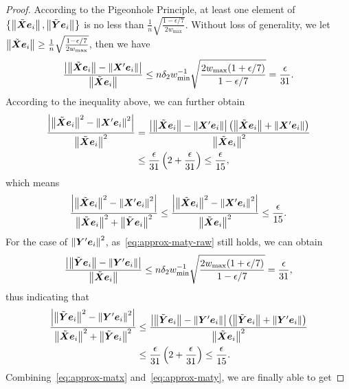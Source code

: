 \documentclass[sigconf]{acmart}
\begin{document}
\begin{proof}
    According to the Pigeonhole Principle, at least one element of \(\setof{\Abs{\tilde{\matx}\vece_i},\Abs{\tilde{\maty}\vece_i}}\) is no less than \(\frac{1}{n}\sqrt{\frac{1-\epsilon/7}{2w_{\max}}}\).
    Without loss of generality, we let \(\Abs{\tilde{\matx}\vece_i}\ge\frac{1}{n}\sqrt{\frac{1-\epsilon/7}{2w_{\max}}}\), then we have
    \[\frac{\abs{\Abs{\tilde{\matx}\vece_i}-\Abs{\matx'\vece_i}}}{\Abs{\tilde{\matx}\vece_i}}\le n\delta_2w_{\min}^{-1}\sqrt{\frac{2w_{\max}(1+\epsilon/7)}{1-\epsilon/7}}=\frac{\epsilon}{31}.\]
    According to the inequality above, we can further obtain
    \begin{align*}
        \frac{\abs{\Abs{\tilde{\matx}\vece_i}^2-\Abs{\matx'\vece_i}^2}}{\Abs{\tilde{\matx}\vece_i}^2} & =\frac{\abs{\Abs{\tilde{\matx}\vece_i}-\Abs{\matx'\vece_i}}\mypar{\Abs{\tilde{\matx}\vece_i}+\Abs{\matx'\vece_i}}}{\Abs{\tilde{\matx}\vece_i}^2} \\
                                                                                                      & \le\frac{\epsilon}{31}\mypar{2+\frac{\epsilon}{31}}\le\frac{\epsilon}{15},
    \end{align*}
    which means
    \begin{equation}\label{eq:approx-matx}
        \frac{\abs{\Abs{\tilde{\matx}\vece_i}^2-\Abs{\matx'\vece_i}^2}}{\Abs{\tilde{\matx}\vece_i}^2+\Abs{\tilde{\maty}\vece_i}^2}\le\frac{\abs{\Abs{\tilde{\matx}\vece_i}^2-\Abs{\matx'\vece_i}^2}}{\Abs{\tilde{\matx}\vece_i}^2}\le\frac{\epsilon}{15}.
    \end{equation}
    For the case of \(\Abs{\maty'\vece_i}^2\), as~\eqref{eq:approx-maty-raw} still holds, we can obtain
    \[\frac{\abs{\Abs{\tilde{\maty}\vece_i}-\Abs{\maty'\vece_i}}}{\Abs{\tilde{\matx}\vece_i}}\le n\delta_2w_{\min}^{-1}\sqrt{\frac{2w_{\max}(1+\epsilon/7)}{1-\epsilon/7}}=\frac{\epsilon}{31},\]
    thus indicating that
    \begin{equation}\label{eq:approx-maty}
        \begin{split}
            \frac{\abs{\Abs{\tilde{\maty}\vece_i}^2-\Abs{\maty'\vece_i}^2}}{\Abs{\tilde{\matx}\vece_i}^2+\Abs{\tilde{\maty}\vece_i}^2}&\le\frac{\abs{\Abs{\tilde{\maty}\vece_i}-\Abs{\maty'\vece_i}}\mypar{\Abs{\tilde{\maty}\vece_i}+\Abs{\maty'\vece_i}}}{\Abs{\tilde{\matx}\vece_i}^2}\\
            &\le\frac{\epsilon}{31}\mypar{2+\frac{\epsilon}{31}}\le\frac{\epsilon}{15}.
        \end{split}
    \end{equation}
    Combining~\eqref{eq:approx-matx} and~\eqref{eq:approx-maty}, we are finally able to get

\end{proof}
\end{document}
